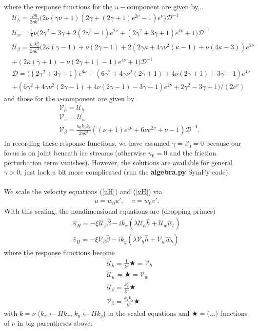 \documentclass[paper=a4, fontsize=11pt]{article}
\begin{document}
where the response functions for the $u-$component are given by...
\begin{align*}
& \mathcal{U}_h   =  \frac{\rho g}{2\eta k^2} \bigg(2\nu(\gamma\nu+1)(2\gamma+(2\gamma+1)e^{2\nu}-1)e^\nu \bigg)\mathcal{D}^{-1}  \\
& \mathcal{U}_w  = \frac{1}{k}\nu\bigg(2\gamma^2-3\gamma+2(2\gamma^2-1)e^{2\nu}+(2\gamma^2+3\gamma+1)e^{4\nu} + 1  \bigg)\mathcal{D}^{-1} \\
& \mathcal{U}_\beta  = \frac{u_0 k_x^2}{2\eta k^3}\bigg(2\kappa(\gamma-1) + \nu(2\gamma-1)+2(2\gamma\kappa+4\gamma\nu^2(\kappa-1)+\nu(4\kappa-3))e^{2\nu} \\ &+ (2\kappa(\gamma+1)-\nu(2\gamma+1)-1)e^{4\nu}+1 \bigg)\mathcal{D}^{-1}  \\
& \mathcal{D}  =  \bigg((2\gamma^2+3\gamma+1)e^{6\nu} + (6\gamma^2 + 4\gamma\nu^2(2\gamma+1) + 4\nu(2\gamma+1)+ 3\gamma -1 )e^{4\nu} \\ &+ (6\gamma^2 + 4\gamma\nu^2(2\gamma-1)+ 4\nu(2\gamma-1)-3\gamma -1)e^{2\nu} +2\gamma^2-3\gamma + 1\bigg)/(2e^{\nu})
\end{align*}
and those for the $v$-component are given by
\begin{align}
  & \mathcal{V}_h = \mathcal{U}_h\\
  & \mathcal{V}_w = \mathcal{U}_w\\
  & \mathcal{V}_\beta  =  \frac{u_0 k_x k_y}{2\eta k^3}\left((\nu+1)e^{4\nu} +6\nu e^{2\nu} + \nu-1\right)\mathcal{D}^{-1} .
\end{align}
In recording these response functions, we have assumed $\gamma=\beta_0=0$
because our focus is on joint beneath ice streams (otherwise $u_0=0$
and the friction perturbation term vanishes). However, the solutions are available
for general $\gamma>0$, just look a bit more complicated (run the \textbf{algebra.py} SymPy code). \\ \\
We scale the velocity equations (\ref{uH}) and (\ref{vH}) via
\begin{align}
u = w_0 u', \;\;\;\; v = w_0v'.
\end{align}
With this scaling, the nondimensional equations are (dropping primes)
\begin{align}
\widehat{u}_H =    -\xi\mathcal{U}_{\beta} \widehat{\beta} -ik_x\left(\lambda\mathcal{U}_h\widehat{h} +  \mathcal{U}_w\widehat{w}_b\right) \label{uHsc}\\
\widehat{v}_H =  -\xi\mathcal{V}_{\beta} \widehat{\beta}-ik_y\left(\lambda\mathcal{V}_h\widehat{h} +  \mathcal{V}_w\widehat{w}_b\right)\label{vHsc}
\end{align}
where the response functions become
\begin{align}
&\mathcal{U}_h =   \frac{1}{k^2} \bigstar   = \mathcal{V}_h \\
&\mathcal{U}_w =  \bigstar  = \mathcal{V}_w \\
&\mathcal{U}_\beta =   \frac{k_x^2}{k^3} \bigstar   \\
&\mathcal{V}_\beta =  \frac{k_x k_y}{k^3} \bigstar
\end{align}
with $k=\nu$ ($k_x \gets Hk_x$, $k_y \gets Hk_y$) in the scaled equations
and $\bigstar = \bigg(\text{...}\bigg)$ functions of $\nu$ in big parentheses above.
\end{document}
